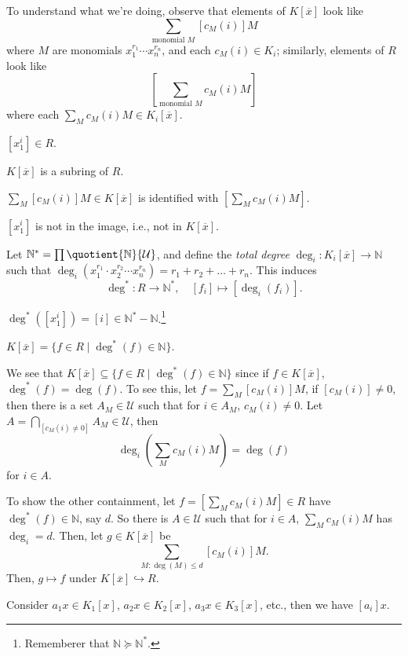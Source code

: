 To understand what we're doing, observe that elements of \(K[\overline{x} ]\) look like
\[
	\sum_{\text{monomial } M} [c_M(i)] M
\]
where \(M\) are monomials \(x_1^{r_1} \cdots x_n^{r_n}\), and each \(c_M(i)\in K_i\); similarly, elements of \(R\) look like
\[
	\left[ \sum_{\text{monomial } M} c_M(i)M \right]
\]
where each \(\sum_{M} c_M(i)M\in K_i[\overline{x} ]\).

\begin{eg}
	\([x_1^i]\in R\).
\end{eg}

\begin{claim}
	\(K[\overline{x} ]\) is a subring of \(R\).
\end{claim}
\begin{explanation}
	\(\sum_{M} [c_M(i)]M \in K[\overline{x} ]\) is identified with \([ \sum_{M} c_M(i)M ]\).

	\begin{note}
		\([x_1^i]\) is not in the image, i.e., not in \(K[\overline{x}]\).
	\end{note}

	Let \(\mathbb{N} ^{\ast} = \prod \quotient{\mathbb{N} }{\mathcal{U} } \), and define the \emph{total degree} \(\deg_i \colon K_i[\overline{x} ] \to \mathbb{N} \) such that \(\deg_i(x_1^{r_1}\cdot x_2^{r_2}\cdots x_n^{r_n}) = r_1 + r_2 + \dots + r_n\). This induces
	\[
		\deg^{\ast} \colon R \to \mathbb{N} ^{\ast},\quad [f_i] \mapsto [\deg_i(f_i)].
	\]
	\begin{eg}
		\(\deg^{\ast} ([x_1^i]) = [i]\in \mathbb{N} ^{\ast} - \mathbb{N} \).\footnote{Rememberer that \(\mathbb{N} \succeq \mathbb{N} ^{\ast} \).}
	\end{eg}

	\begin{claim}
		\(K[\overline{x} ] = \{ f\in R \mid \deg^{\ast} (f) \in \mathbb{N}  \} \).
	\end{claim}
	\begin{explanation}
		We see that \(K[\overline{x} ] \subseteq \{ f\in R \mid \deg^{\ast} (f)\in \mathbb{N}  \} \) since if \(f\in K[\overline{x} ]\), \(\deg^{\ast} (f) = \deg(f)\). To see this, let \(f = \sum_{M} [c_M(i)]M\), if \([c_M(i)] \neq 0\), then there is a set \(A_M\in \mathcal{U} \) such that for \(i\in A_M\), \(c_M(i) \neq 0\). Let \(A = \bigcap_{[c_M(i) \neq 0]} A_M \in \mathcal{U} \), then
		\[
			\deg_{i}\left( \sum_{M} c_M(i) M \right) = \deg(f)
		\]
		for \(i\in A\).

		To show the other containment, let \(f = [\sum_{M} c_M(i)M]\in R\) have \(\deg^{\ast} (f)\in \mathbb{N} \), say \(d\). So there is \(A\in \mathcal{U} \) such that for \(i\in A\), \(\sum_{M} c_M(i) M\) has \(\deg_i=d\). Then, let \(g\in K[\overline{x} ]\) be
		\[
			\sum_{M \colon \deg(M) \leq d} [c_M(i)]M.
		\]
		Then, \(g \mapsto f\) under \(K[\overline{x} ] \hookrightarrow R\).
	\end{explanation}

	\begin{intuition}
		Consider \(a_1 x \in K_1[x]\), \(a_2 x \in K_2[x]\), \(a_3 x \in K_3[x]\), etc., then we have \([a_i] x\).
	\end{intuition}
\end{explanation}

